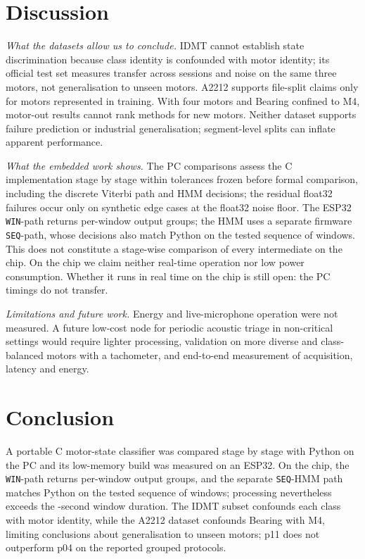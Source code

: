 \documentclass[conference]{IEEEtran}
\newif\ifwip
\begin{document}

\FloatBarrier
\section{Discussion}

\emph{What the datasets allow us to conclude.} IDMT cannot establish state discrimination because
class identity is confounded with motor identity; its official test set measures transfer across
sessions and noise on the same three motors, not generalisation to unseen motors. A2212 supports file-split
claims only for motors represented in training. With four motors and Bearing confined to M4,
motor-out results cannot rank methods for new motors. Neither dataset supports failure prediction
or industrial generalisation; segment-level splits can inflate apparent performance.

\ifwip\else
\emph{What the embedded work shows.} The PC comparisons assess the C implementation stage by
stage within tolerances frozen before formal comparison, including the discrete Viterbi path and
HMM decisions; the residual float32 failures occur only on synthetic edge cases at the float32
noise floor. The ESP32 \texttt{WIN}-path returns \VChipEqStages{} per-window output groups; the HMM uses a
separate firmware \texttt{SEQ}-path, whose decisions also match Python on the tested sequence of
\VChipSeqWindows{} windows. This does not constitute a stage-wise comparison of every
intermediate on the chip.
\ifchipmedido
On the chip we claim neither real-time operation nor low power consumption.
\else
Whether it runs in real time on the chip is still open: the PC timings do not transfer.
\fi
\fi

\emph{Limitations and future work.} Energy and live-microphone operation were not measured. A
future low-cost node for periodic acoustic triage in non-critical settings would require lighter
processing, validation on more diverse and class-balanced motors with a tachometer, and end-to-end
measurement of acquisition, latency and energy.

\section{Conclusion}

A portable C motor-state classifier was compared stage by stage with Python on the PC and its
low-memory build was measured on an ESP32. On the chip, the \texttt{WIN}-path returns
\VChipEqStages{} per-window output groups, and the separate \texttt{SEQ}-HMM path matches Python on the tested
sequence of \VChipSeqWindows{} windows; processing nevertheless exceeds the
\VParSegBldc{}-second window duration. The IDMT
subset confounds each class with motor identity, while the A2212 dataset confounds Bearing with
M4, limiting conclusions about generalisation to unseen motors; p11 does not outperform p04 on
the reported grouped protocols.

\clearpage
\balance


\end{document}
